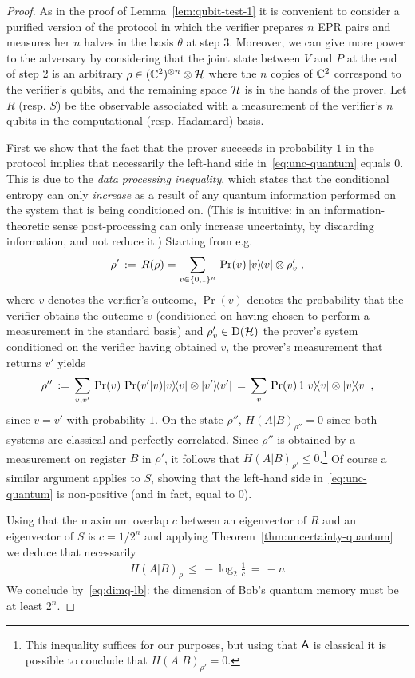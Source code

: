 \begin{proof} 
As in the proof of Lemma~\ref{lem:qubit-test-1} it is convenient to consider a purified version of the protocol in which the verifier prepares $n$ EPR pairs and measures her $n$ halves in the basis $\theta$ at step $3$. Moreover, we can give more power to the adversary by considering that the joint state between $V$ and $P$ at the end of step 2 is an arbitrary $\rho \in (\mathbb{C}^2)^{\otimes n} \otimes \mathcal{H}$ where the $n$ copies of $\mathbb{C}^2$ correspond to the verifier's qubits, and the remaining space $\mathcal{H}$ is in the hands of the prover. Let $R$ (resp. $S$) be the observable associated with a measurement of the verifier's $n$ qubits in the computational (resp. Hadamard) basis. 

First we show that the fact that the prover succeeds in probability $1$ in the protocol implies that necessarily the left-hand side in~\eqref{eq:unc-quantum} equals $0$. This is due to the \emph{data processing inequality}, which states that the conditional entropy can only \emph{increase} as a result of any quantum information performed on the system that is being conditioned on. (This is intuitive: in an information-theoretic sense post-processing can only {increase} uncertainty, by discarding information, and not reduce it.) Starting from e.g. 
\[\rho'\,:=\, R(\rho) = \sum_{v\in\{0,1\}^n}\, \Pr(v)\, |v\rangle\!\langle v|\otimes \rho'_v\;,\]
 where $v$ denotes the verifier's outcome, $\Pr(v)$  denotes the probability that the verifier obtains the outcome $v$ (conditioned on having chosen to perform a measurement in the standard basis) and $\rho'_v\in\mathrm{D}(\mathcal{H})$ the prover's system conditioned on the verifier having obtained $v$, the prover's measurement that returns $v'$ yields 
\[\rho''\,:=\, \sum_{v,v'} \,\Pr(v)\, \Pr(v'|v) |v\rangle\!\langle v| \otimes |v'\rangle\!\langle v'| \,=\,\sum_{v} \,\Pr(v)\, 1 |v\rangle\!\langle v| \otimes |v\rangle\!\langle v|\;,\]
since $v=v'$ with probability $1$.  On the state $\rho''$, $H(A|B)_{\rho''}=0$ since both systems are classical and perfectly correlated. Since $\rho''$ is obtained by a measurement on register $B$ in $\rho'$, it follows that $H(A|B)_{\rho'} \leq 0$.\footnote{This inequality suffices for our purposes, but using that ${\textsf{A}}$ is classical it is possible to conclude that $H(A|B)_{\rho'} = 0$.} Of course a similar argument applies to $S$, showing that the left-hand side in~\eqref{eq:unc-quantum} is non-positive (and in fact, equal to $0$). 

Using that the maximum overlap $c$ between an eigenvector of $R$ and an eigenvector of $S$ is $c=1/2^n$ and applying Theorem~\ref{thm:uncertainty-quantum} we deduce that necessarily 
\begin{align*}
H(A|B)_\rho \,\leq\, -\log_2 \frac{1}{c} \,=\, -n
\end{align*}
We conclude by~\eqref{eq:dimq-lb}: the dimension of Bob's quantum memory must be at least $2^n$. \end{proof}

